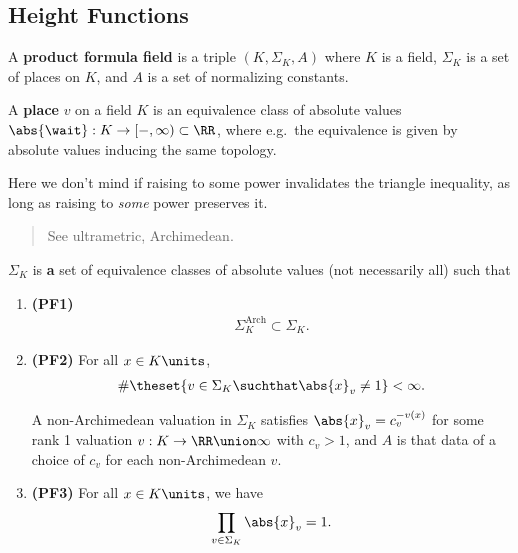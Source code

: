 \hypertarget{height-functions}{%
\subsection{Height Functions}\label{height-functions}}

\begin{description}
\tightlist
\item[Definition (Product Formula Field)]
A \textbf{product formula field} is a triple \((K, \Sigma_K, A)\) where
\(K\) is a field, \(\Sigma_K\) is a set of places on \(K\), and \(A\) is
a set of normalizing constants.
\item[Definition (Place)]
A \textbf{place} \(v\) on a field \(K\) is an equivalence class of
absolute values \(\abs{\wait}: K \to [-, \infty)\subset \RR\), where
e.g.~the equivalence is given by absolute values inducing the same
topology.
\end{description}

Here we don't mind if raising to some power invalidates the triangle
inequality, as long as raising to \emph{some} power preserves it.

\begin{quote}
See ultrametric, Archimedean.
\end{quote}

\(\Sigma_K\) is \textbf{a} set of equivalence classes of absolute values
(not necessarily all) such that

\begin{enumerate}
\def\labelenumi{\arabic{enumi}.}
\item
  \textbf{(PF1)}
  \begin{align*}
    \Sigma_K^{\text{Arch}}  \subset \Sigma_K
    .\end{align*}
\item
  \textbf{(PF2)} For all \(x\in K\units\),
  \begin{align*}
    \# \theset{ v\in \Sigma_K  \suchthat \abs{x}_v \neq 1} < \infty.
    \end{align*}

  A non-Archimedean valuation in \(\Sigma_K\) satisfies
  \(\abs{x}_v = c_v^{-v(x)}\) for some rank 1 valuation
  \(v: K \to \RR\union\infty\) with \(c_v > 1\), and \(A\) is that data
  of a choice of \(c_v\) for each non-Archimedean \(v\).
\item
  \textbf{(PF3)} For all \(x\in K\units\), we have
  \begin{align*}
    \prod_{v\in \Sigma_K} \abs{x}_v = 1
    .\end{align*}
\end{enumerate}


